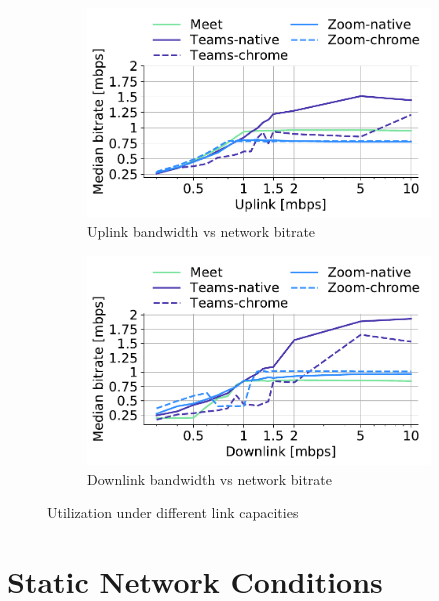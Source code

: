 \begin{figure}[t]
\begin{subfigure}[t]{0.45\textwidth}
    \centering
    \includegraphics[width=\textwidth,keepaspectratio]{figures/static/uplink.pdf}
    \caption{Uplink bandwidth vs network bitrate}
	\label{subfig:uplink_bitrate}
\end{subfigure}
\begin{subfigure}[t]{0.45\textwidth}
\centering
    \includegraphics[width=\textwidth,keepaspectratio]{figures/static/downlink.pdf}
    \caption{Downlink bandwidth vs network bitrate}
	\label{subfig:downlink_bitrate}
\end{subfigure} 
\caption{Utilization under different link capacities}
\label{fig:static}
\end{figure}

\section{Static Network Conditions}\label{sec:static}

